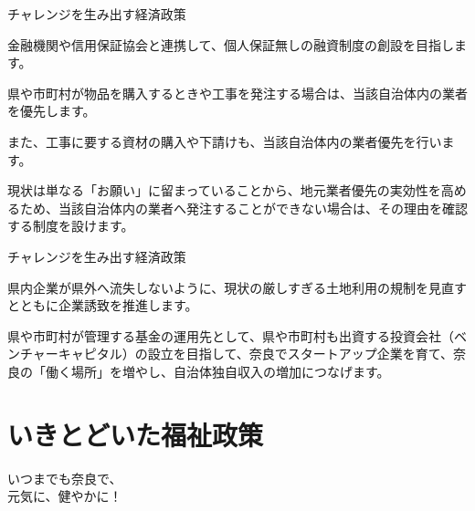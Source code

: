 \documentclass[dvipdfmx]{beamer}
\begin{document}
    \begin{frame}{チャレンジを生み出す経済政策}{}
        \begin{small}
            \begin{description}
                \setlength{\parsep}{.5mm}
                \setlength{\itemsep}{2mm}
                \item[保証人無しの融資制度の創設] \mbox{}\par
                金融機関や信用保証協会と連携して、個人保証無しの融資制度の創設を目指します。
                \item[地元業者への優先発注] \mbox{}\par
                県や市町村が物品を購入するときや工事を発注する場合は、当該自治体内の業者を優先します。\par
                また、工事に要する資材の購入や下請けも、当該自治体内の業者優先を行います。\par
                現状は単なる「お願い」に留まっていることから、地元業者優先の実効性を高めるため、当該自治体内の業者へ発注することができない場合は、その理由を確認する制度を設けます。
            \end{description}
        \end{small}
    \end{frame}

    \begin{frame}{チャレンジを生み出す経済政策}{}
        \begin{small}
            \begin{description}
                \setlength{\parsep}{.5mm}
                \setlength{\itemsep}{2mm}
                \item[土地利用の規制緩和] \mbox{}\par
                県内企業が県外へ流失しないように、現状の厳しすぎる土地利用の規制を見直すとともに企業誘致を推進します。
                \item[スタートアップ（起業）への支援] \mbox{}\par
                県や市町村が管理する基金の運用先として、県や市町村も出資する投資会社（ベンチャーキャピタル）の設立を目指して、奈良でスタートアップ企業を育て、奈良の「働く場所」を増やし、自治体独自収入の増加につなげます。
            \end{description}
        \end{small}
    \end{frame}
    
\section{いきとどいた福祉政策}
    \begin{frame}{}{}
        \sectionpage
        \begin{center}
            \begin{large}
                \alert{いつまでも奈良で、}\\\alert{元気に、健やかに！}
            \end{large}
        \end{center}
    \end{frame}
\end{document}
